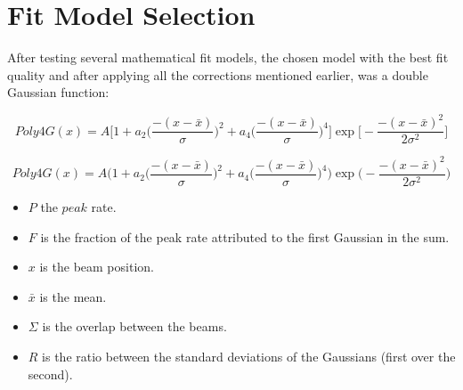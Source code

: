 \section{Fit Model  Selection}

After testing several mathematical fit models, the chosen model with the best fit quality and after applying all the corrections mentioned earlier, was a double Gaussian function:
 
 
\begin{equation} 
Poly4G(x)= A \Biggl[ 1+a_{2} \Biggl( \frac{-(x-\bar{x})}{\sigma} \Biggr)^{2} +a_{4} \Biggl( \frac{-(x-\bar{x})}{\sigma} \Biggr)^{4} \Biggr]\exp \Biggl[ -\frac{-(x-\bar{x})^{2}}{2\sigma^{2}}\Biggr]
\end{equation}
 
 
\begin{equation} 
Poly4G(x)= A \Biggl( 1+a_{2} \biggl( \frac{-(x-\bar{x})}{\sigma} \biggr)^{2} +a_{4} \biggl( \frac{-(x-\bar{x})}{\sigma} \biggr)^{4} \Biggr)\exp \Biggl( -\frac{-(x-\bar{x})^{2}}{2\sigma^{2}}\Biggr)
\end{equation}
 
\begin{itemize}
\item $P$ the $peak$ rate.
\item $F$ is the fraction of the peak rate attributed to the first Gaussian in the sum.
\item $x$ is the beam position.
\item $\bar{x}$ is the mean.
\item $\Sigma$ is the overlap between the beams.
\item $R$ is the ratio between the standard deviations of the  Gaussians (first over the second).
\end{itemize}



